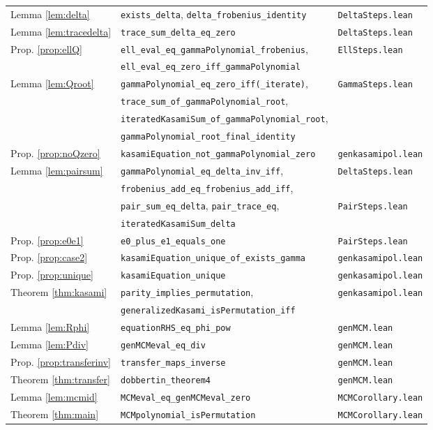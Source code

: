 \documentclass[11pt,a4paper]{article}
\theoremstyle{definition}
\begin{document}
\begin{center}
\begin{tabular}{lll}
Lemma \ref{lem:delta} & \texttt{exists\_delta}, \texttt{delta\_frobenius\_identity} & \texttt{DeltaSteps.lean}\\
Lemma \ref{lem:tracedelta} & \texttt{trace\_sum\_delta\_eq\_zero} & \texttt{DeltaSteps.lean}\\
Prop. \ref{prop:ellQ} & \texttt{ell\_eval\_eq\_gammaPolynomial\_frobenius}, & \texttt{EllSteps.lean}\\
 & \texttt{ell\_eval\_eq\_zero\_iff\_gammaPolynomial} & \\
Lemma \ref{lem:Qroot} & \texttt{gammaPolynomial\_eq\_zero\_iff(\_iterate)}, & \texttt{GammaSteps.lean}\\
 & \texttt{trace\_sum\_of\_gammaPolynomial\_root}, & \\
 & \texttt{iteratedKasamiSum\_of\_gammaPolynomial\_root}, & \\
 & \texttt{gammaPolynomial\_root\_final\_identity} & \\
Prop. \ref{prop:noQzero} & \texttt{kasamiEquation\_not\_gammaPolynomial\_zero} & \texttt{genkasamipol.lean}\\
Lemma \ref{lem:pairsum} & \texttt{gammaPolynomial\_eq\_delta\_inv\_iff}, & \texttt{DeltaSteps.lean}\\
 & \texttt{frobenius\_add\_eq\_frobenius\_add\_iff}, & \\
 & \texttt{pair\_sum\_eq\_delta}, \texttt{pair\_trace\_eq}, & \texttt{PairSteps.lean}\\
 & \texttt{iteratedKasamiSum\_delta} & \\
Prop. \ref{prop:e0e1} & \texttt{e0\_plus\_e1\_equals\_one} & \texttt{PairSteps.lean}\\
Prop. \ref{prop:case2} & \texttt{kasamiEquation\_unique\_of\_exists\_gamma} & \texttt{genkasamipol.lean}\\
Prop. \ref{prop:unique} & \texttt{kasamiEquation\_unique} & \texttt{genkasamipol.lean}\\
Theorem \ref{thm:kasami} & \texttt{parity\_implies\_permutation}, & \texttt{genkasamipol.lean}\\
 & \texttt{generalizedKasami\_isPermutation\_iff} & \\
Lemma \ref{lem:Rphi} & \texttt{equationRHS\_eq\_phi\_pow} & \texttt{genMCM.lean}\\
Lemma \ref{lem:Pdiv} & \texttt{genMCMeval\_eq\_div} & \texttt{genMCM.lean}\\
Prop. \ref{prop:transferinv} & \texttt{transfer\_maps\_inverse} & \texttt{genMCM.lean}\\
Theorem \ref{thm:transfer} & \texttt{dobbertin\_theorem4} & \texttt{genMCM.lean}\\
Lemma \ref{lem:mcmid} & \texttt{MCMeval\_eq\_genMCMeval\_zero} & \texttt{MCMCorollary.lean}\\
Theorem \ref{thm:main} & \texttt{MCMpolynomial\_isPermutation} & \texttt{MCMCorollary.lean}\\
\hline
\end{tabular}
\end{center}
\end{document}
